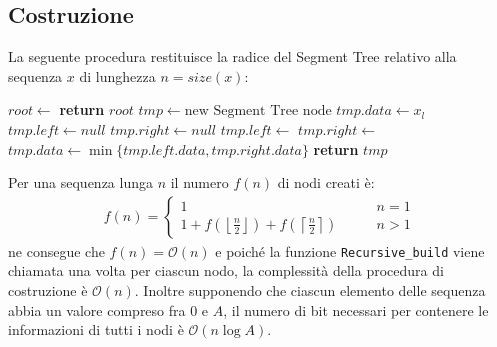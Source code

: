 \documentclass{article}
\begin{document}
\subsection{Costruzione}
La seguente procedura restituisce la radice del Segment Tree relativo alla sequenza $x$ di lunghezza $n=size(x)$:
    \begin{algorithmic}[1]
        \State $root\gets$
        \State \textbf{return} $root$
    \EndProcedure
    \State
        \State $tmp\gets\text{new Segment Tree node}$
            \State $tmp.data\gets x_l$
            \State $tmp.left\gets null$
            \State $tmp.right\gets null$
        \Else
            \State $tmp.left\gets$
            \State $tmp.right\gets$
            \State $tmp.data\gets\min\{tmp.left.data,tmp.right.data\}$
        \EndIf
        \State \textbf{return} $tmp$
    \EndFunction
    \end{algorithmic}
Per una sequenza lunga $n$ il numero $f(n)$ di nodi  creati è:
    \begin{align*}
        f(n)=
        \begin{cases}
            1 \qquad &n=1 \\
            1+f(\left\lfloor{\frac{n}{2}}\right\rfloor)+f(\left\lceil{\frac{n}{2}}\right\rceil) \qquad &n>1
        \end{cases}
    \end{align*}
ne consegue che $f(n)=\mathcal{O}(n)$ e poiché la funzione \texttt{Recursive\_build} viene chiamata una volta per ciascun nodo, la complessità della procedura di costruzione è $\mathcal{O}(n)$. Inoltre supponendo che ciascun elemento delle sequenza abbia un valore compreso fra $0$ e $A$, il numero di bit necessari per contenere le informazioni di tutti i nodi è $\mathcal{O}(n\log{A})$.
\end{document}
